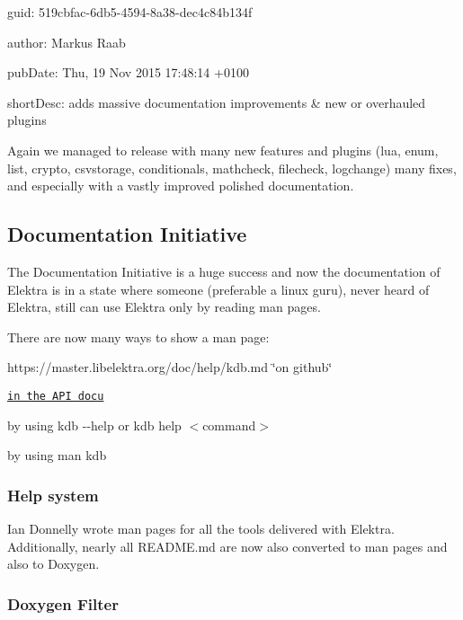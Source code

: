 
\begin{DoxyItemize}
\item guid\+: 519cbfac-\/6db5-\/4594-\/8a38-\/dec4c84b134f
\item author\+: Markus Raab
\item pub\+Date\+: Thu, 19 Nov 2015 17\+:48\+:14 +0100
\item short\+Desc\+: adds massive documentation improvements \& new or overhauled plugins
\end{DoxyItemize}

Again we managed to release with many new features and plugins (lua, enum, list, crypto, csvstorage, conditionals, mathcheck, filecheck, logchange) many fixes, and especially with a vastly improved polished documentation.

\subsection*{Documentation Initiative}

The Documentation Initiative is a huge success and now the documentation of Elektra is in a state where someone (preferable a linux guru), never heard of Elektra, still can use Elektra only by reading man pages.

There are now many ways to show a man page\+:


\begin{DoxyItemize}
\item https\+://master.libelektra.\+org/doc/help/kdb.md \char`\"{}on github\char`\"{}
\item \href{https://doc.libelektra.org/api/latest/html/doc_help_kdb_md.html}{\tt in the A\+PI docu}
\item by using {\ttfamily kdb -\/-\/help} or {\ttfamily kdb help $<$command$>$}
\item by using {\ttfamily man kdb}
\end{DoxyItemize}

\subsubsection*{Help system}

Ian Donnelly wrote man pages for all the tools delivered with Elektra. Additionally, nearly all R\+E\+A\+D\+M\+E.\+md are now also converted to man pages and also to Doxygen.

\subsubsection*{Doxygen Filter}

